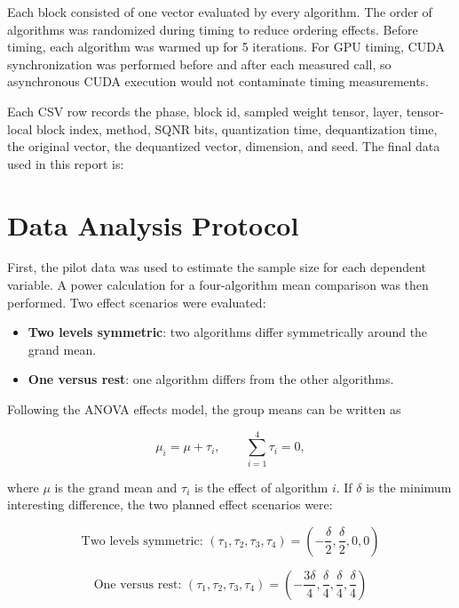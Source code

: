 \documentclass[11pt]{article}
\begin{document}
Each block consisted of one vector evaluated by every algorithm. The order of algorithms was randomized during timing to reduce ordering effects. Before timing, each algorithm was warmed up for 5 iterations. For GPU timing, CUDA synchronization was performed before and after each measured call, so asynchronous CUDA execution would not contaminate timing measurements.

Each CSV row records the phase, block id, sampled weight tensor, layer, tensor-local block index, method, SQNR bits, quantization time, dequantization time, the original vector, the dequantized vector, dimension, and seed. The final data used in this report is:

\begin{center}
\small{}
\end{center}

\section{Data Analysis Protocol}

First, the pilot data was used to estimate the sample size for each dependent variable. A power calculation for a four-algorithm mean comparison was then performed. Two effect scenarios were evaluated:

\begin{itemize}
    \item \textbf{Two levels symmetric}: two algorithms differ symmetrically around the grand mean.
    \item \textbf{One versus rest}: one algorithm differs from the other algorithms.
\end{itemize}

Following the ANOVA effects model, the group means can be written as

\[
\mu_i = \mu + \tau_i,
\qquad
\sum_{i=1}^{4}\tau_i = 0,
\]

where \(\mu\) is the grand mean and \(\tau_i\) is the effect of algorithm \(i\). If \(\delta\) is the minimum interesting difference, the two planned effect scenarios were:

\[
\text{Two levels symmetric: }
(\tau_1,\tau_2,\tau_3,\tau_4)
=
\left(-\frac{\delta}{2},\frac{\delta}{2},0,0\right)
\]

\[
\text{One versus rest: }
(\tau_1,\tau_2,\tau_3,\tau_4)
=
\left(-\frac{3\delta}{4},\frac{\delta}{4},\frac{\delta}{4},\frac{\delta}{4}\right)
\]
\end{document}
